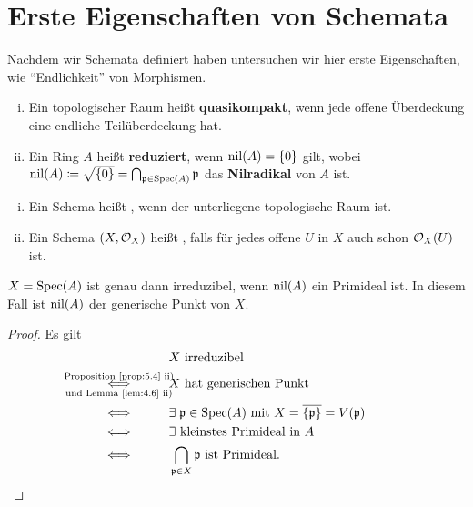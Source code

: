 
\chapter{Erste Eigenschaften von Schemata}
\label{chap:6}

Nachdem wir Schemata definiert haben untersuchen wir hier erste Eigenschaften, wie \enquote{Endlichkeit} von Morphismen.

\begin{eri}
\label{eri:6.1}
	\begin{enumerate}[i)]
		\item Ein topologischer Raum heißt \textbf{quasikompakt}, wenn jede offene Überdeckung eine endliche Teilüberdeckung hat.
		\item Ein Ring $A$ heißt \textbf{reduziert}, wenn $\operatorname{nil}(A) = \{0\}$ gilt, wobei $\operatorname{nil}(A) \coloneqq \sqrt{\{0\}} = \bigcap_{\mathfrak{p} \in \operatorname{Spec}(A)} \mathfrak{p}$ das \textbf{Nilradikal} von $A$ ist.
	\end{enumerate}
\end{eri}

\begin{defn}
\label{defn:6.2}
	\begin{enumerate}[i)]
		\item Ein Schema heißt
		,
		wenn der unterliegene topologische Raum
		ist.
		\item Ein Schema $(X, \mathcal{O}_X)$ heißt
		,
		falls für jedes offene $U$ in $X$ auch schon $\mathcal{O}_X(U)$
		ist.
	\end{enumerate}
\end{defn}

\begin{lem}
\label{lem:6.3}
	$X=\operatorname{Spec}(A)$ ist genau dann irreduzibel, wenn $\operatorname{nil}(A)$ ein Primideal ist. In diesem Fall ist $\operatorname{nil}(A)$ der generische Punkt von $X$.
	\begin{proof}
		Es gilt
		\begin{align*}
			&X \text{ irreduzibel}\\
			\underset{\mathclap{\text{und Lemma~\ref{lem:4.6} ii)}}}{\overset{\mathclap{\text{Proposition~\ref{prop:5.4} ii)}}}{\Longleftrightarrow}} \qquad\quad & X \text{ hat generischen Punkt}\\
			 \Longleftrightarrow \qquad\quad & \exists\; \mfp \in \Spec(A) \text{ mit } X = \overline{\{\mfp\}} = V(\mfp)\\
			 \Longleftrightarrow \qquad\quad & \exists \text{ kleinstes Primideal in } A\\
			 \Longleftrightarrow \qquad\quad &  \bigcap_{\mfp \in X} \mfp \text{ ist Primideal} .
		\end{align*}
	\end{proof}
\end{lem}

